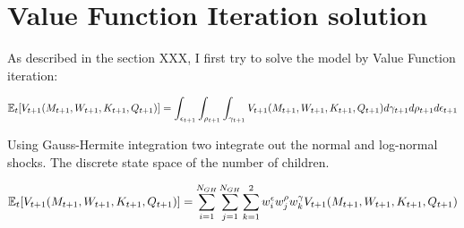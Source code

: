 \section{Value Function Iteration solution}

As described in the section XXX, I first try to solve the model by Value Function iteration:

\begin{equation}
    \mathbb{E}_{t}[V_{t+1}(M_{t+1}, W_{t+1}, K_{t+1}, Q_{t+1})] = \int_{\epsilon_{t+1}}  \int_{\rho_{t+1}} \int_{\gamma_{t+1}} V_{t+1} (M_{t+1}, W_{t+1}, K_{t+1}, Q_{t+1}) d \gamma_{t+1} d\rho_{t+1}  d \epsilon_{t+1}
\end{equation}

Using Gauss-Hermite integration two integrate out the normal and log-normal shocks. The discrete state space of the number of children.

\begin{equation}
    \mathbb{E}_{t}[V_{t+1}(M_{t+1}, W_{t+1}, K_{t+1}, Q_{t+1})] =  \sum_{i=1}^{N_{GH}} \sum_{j=1}^{N_{GH}} \sum_{k=1}^{2} w_{i}^{\epsilon} w_j^{\rho} w_{k}^{\gamma}   V_{t+1} (M_{t+1}, W_{t+1}, K_{t+1}, Q_{t+1}) 
\end{equation}    
